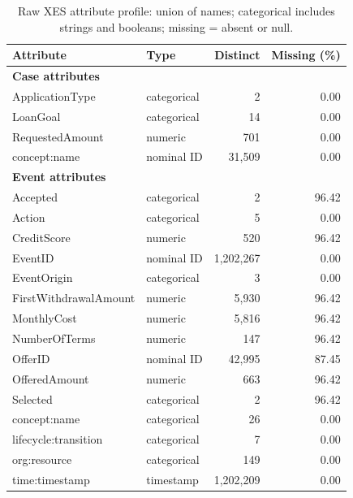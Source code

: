 
\begin{table}[htbp]
\centering
\small
\caption{Raw XES attribute profile: union of names; categorical includes strings and booleans; missing = absent or null.}
\label{tab:raw-attributes}
\begin{tabular}{@{}llrr@{}}
\toprule
Attribute & Type & Distinct & Missing (\%) \\
\midrule
\multicolumn{4}{l}{\textbf{Case attributes}} \\
ApplicationType & categorical & 2 & 0.00 \\
LoanGoal & categorical & 14 & 0.00 \\
RequestedAmount & numeric & 701 & 0.00 \\
concept:name & nominal ID & 31,509 & 0.00 \\
\midrule
\multicolumn{4}{l}{\textbf{Event attributes}} \\
Accepted & categorical & 2 & 96.42 \\
Action & categorical & 5 & 0.00 \\
CreditScore & numeric & 520 & 96.42 \\
EventID & nominal ID & 1,202,267 & 0.00 \\
EventOrigin & categorical & 3 & 0.00 \\
FirstWithdrawalAmount & numeric & 5,930 & 96.42 \\
MonthlyCost & numeric & 5,816 & 96.42 \\
NumberOfTerms & numeric & 147 & 96.42 \\
OfferID & nominal ID & 42,995 & 87.45 \\
OfferedAmount & numeric & 663 & 96.42 \\
Selected & categorical & 2 & 96.42 \\
concept:name & categorical & 26 & 0.00 \\
lifecycle:transition & categorical & 7 & 0.00 \\
org:resource & categorical & 149 & 0.00 \\
time:timestamp & timestamp & 1,202,209 & 0.00 \\
\bottomrule
\end{tabular}
\end{table}
